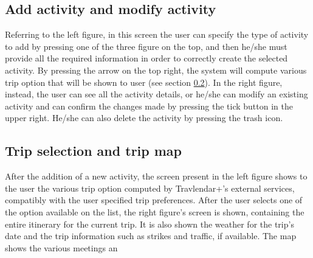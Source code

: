 \documentclass[12pt,titlepage]{article}
\begin{document}
\begin{figure}[H]
\centering
{}
\end{figure}
\clearpage
\newpage

\subsection{Add activity and modify activity}\label{activityScreen}
Referring to the left figure, in this screen the user can specify the type of activity to add by pressing one of the three figure on the top, and then he/she must provide all the required information in order to correctly create the selected activity. By pressing the arrow on the top right, the system will compute various trip option that will be shown to user (see section \ref{trip}). 
In the right figure, instead, the user can see all the activity details, or he/she can modify an existing activity and can confirm the changes made by pressing the tick button in the upper right. He/she can also delete the activity by pressing the trash icon.
\begin{figure}[H]
\centering
{}
\end{figure}
\clearpage
\newpage

\subsection{Trip selection and trip map}\label{trip}
After the addition of a new activity, the screen present in the left figure shows to the user the various trip option computed by Travlendar+'s external services, compatibly with the user specified trip preferences. After the user selects one of the option available on the list, the right figure's screen is shown, containing the entire itinerary for the current trip. It is also shown the weather for the trip's date and the trip information such as strikes and traffic, if available. The map shows the various meetings an
\end{document}

